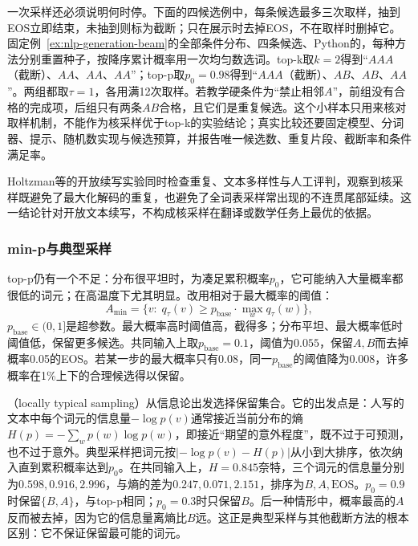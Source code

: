 一次采样还必须说明何时停。下面的四候选例中，每条候选最多三次取样，抽到EOS立即结束，未抽到则标为截断；只在展示时去掉EOS，不在取样时删掉它。固定例~\ref{ex:nlp-generation-beam}的全部条件分布、四条候选、Python的，每种方法分别重置种子，按降序累计概率用一次均匀数选词。top-k取$k=2$得到“$AAA$（截断）、$AA$、$AA$、$AA$”；top-p取$p_0=0.98$得到“$AAA$（截断）、$AB$、$AB$、$AA$”。两组都取$\tau=1$，各用满12次取样。若教学硬条件为“禁止相邻$A$”，前组没有合格的完成项，后组只有两条$AB$合格，且它们是重复候选。这个小样本只用来核对取样机制，不能作为核采样优于top-k的实验结论；真实比较还要固定模型、分词器、提示、随机数实现与候选预算，并报告唯一候选数、重复片段、截断率和条件满足率。

Holtzman等的开放续写实验同时检查重复、文本多样性与人工评判，观察到核采样既避免了最大化解码的重复，也避免了全词表采样常出现的不连贯尾部延续。这一结论针对开放文本续写，不构成核采样在翻译或数学任务上最优的依据。

\subsubsection{min-p与典型采样}
\label{sec:nlp-inference-minp-typical}

top-p仍有一个不足：分布很平坦时，为凑足累积概率$p_0$，它可能纳入大量概率都很低的词元；在高温度下尤其明显。改用相对于最大概率的阈值\cite{nlp-inference-nguyen2025minp}：
\begin{equation}
 A_{\min}=\{v:\;q_\tau(v)\geq p_{\mathrm{base}}\cdot\max_wq_\tau(w)\},
 \label{eq:nlp-inference-minp}
\end{equation}
$p_{\mathrm{base}}\in(0,1]$是超参数。最大概率高时阈值高，截得多；分布平坦、最大概率低时阈值低，保留更多候选。共同输入上取$p_{\mathrm{base}}=0.1$，阈值为$0.055$，保留$A,B$而去掉概率0.05的EOS。若某一步的最大概率只有0.08，同一$p_{\mathrm{base}}$的阈值降为0.008，许多概率在1\%上下的合理候选得以保留。

（locally typical sampling）从信息论出发选择保留集合。它的出发点是：人写的文本中每个词元的信息量$-\log p(v)$通常接近当前分布的熵$H(p)=-\sum_wp(w)\log p(w)$，即接近“期望的意外程度”，既不过于可预测，也不过于意外。典型采样把词元按$|-\log p(v)-H(p)|$从小到大排序，依次纳入直到累积概率达到$p_0$。在共同输入上，$H=0.845$奈特，三个词元的信息量分别为$0.598,0.916,2.996$，与熵的差为$0.247,0.071,2.151$，排序为$B,A,\mathrm{EOS}$。$p_0=0.9$时保留$\{B,A\}$，与top-p相同；$p_0=0.3$时只保留$B$。后一种情形中，概率最高的$A$反而被去掉，因为它的信息量离熵比$B$远。这正是典型采样与其他截断方法的根本区别：它不保证保留最可能的词元。

